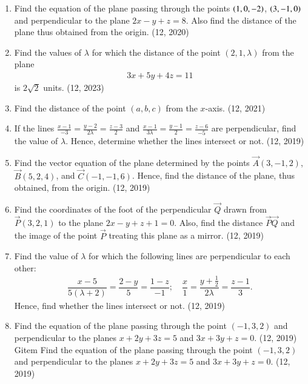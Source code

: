 \begin{enumerate}[label=\thesubsection.\arabic*, ref=\thesubsection.\theenumi]
\item Find the equation of the plane passing through the points $\left(1, 0, -2\right)$,  $\left(3, -1, 0\right)$ and perpendicular to the plane $2x - y + z = 8$. Also find the distance of the plane thus obtained from the origin.
\hfill (12, 2020)
    \item Find the values of $\lambda$ for which the distance of the point $(2, 1, \lambda)$ from the plane
    \begin{align}
        3x + 5y + 4z = 11
    \end{align}
    is $2\sqrt{2}$ units.
    \hfill (12, 2023)
	\item Find the distance of the point $(a, b, c)$ from the $x$-axis. \hfill (12, 2021)
	\item If the lines $\frac{x-1}{-3} = \frac{y-2}{2\lambda} = \frac{z-3}{2}$ and $\frac{x-1}{3\lambda} = \frac{y-1}{2} = \frac{z-6}{-5}$ are perpendicular, find the value of $\lambda$. Hence, determine whether the lines intersect or not. \hfill (12, 2019)
	\item Find the vector equation of the plane determined by the points $\vec{A}(3, -1, 2)$, $\vec{B}(5, 2, 4)$, and $\vec{C}(-1, -1, 6)$. Hence, find the distance of the plane, thus obtained, from the origin. \hfill (12, 2019)
	\item Find the coordinates of the foot of the perpendicular $\vec{Q}$ drawn from $\vec{P}(3, 2, 1)$ to the plane $2x - y + z + 1 = 0$. Also, find the distance $\vec{P}\vec{Q}$ and the image of the point $\vec{P}$ treating this plane as a mirror. \hfill (12, 2019)
	\item Find the value of $\lambda$ for which the following lines are perpendicular to each other:
	\begin{align*}
	\dfrac{x-5}{5(\lambda+2)} = \dfrac{2-y}{5} = \dfrac{1-z}{-1}; \quad \dfrac{x}{1} = \dfrac{y + \frac{1}{2}}{2\lambda} = \dfrac{z-1}{3}.
	\end{align*}
	Hence, find whether the lines intersect or not. \hfill (12, 2019)
	\item Find the equation of the plane passing through the point $(-1, 3, 2)$ and perpendicular to the planes $x + 2y + 3z = 5$ and $3x + 3y + z = 0$. \hfill (12, 2019)
	Gitem Find the equation of the plane passing through the point $(-1, 3, 2)$ and perpendicular to the planes $x + 2y + 3z = 5$ and $3x + 3y + z = 0$. \hfill (12, 2019)
	

\end{enumerate}

